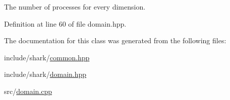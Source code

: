 The number of processes for every dimension. 

Definition at line 60 of file domain.\+hpp.



The documentation for this class was generated from the following files\+:\begin{DoxyCompactItemize}
\item 
include/shark/\hyperlink{common_8hpp}{common.\+hpp}\item 
include/shark/\hyperlink{domain_8hpp}{domain.\+hpp}\item 
src/\hyperlink{domain_8cpp}{domain.\+cpp}\end{DoxyCompactItemize}
